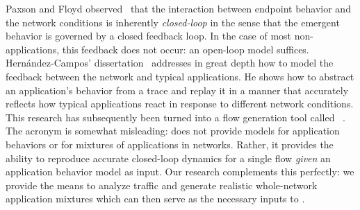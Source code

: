 \documentclass[twocolumn,final]{svjour3}
\begin{document}
Paxson and Floyd observed~\cite{Paxson95} that the interaction between endpoint behavior and the network conditions is inherently \textit{closed-loop} in the sense that the emergent behavior is governed by a closed feedback loop.
In the case of most non- applications, this feedback does not occur: an open-loop model suffices.
Hern\'andez-Campos' dissertation~\cite{Hernandez06:dissertation} addresses in great depth how to model the feedback between the network and typical  applications.
He shows how to abstract an application's behavior from a  trace and replay it in a manner that accurately reflects how typical applications react in response to different network conditions.
This research has subsequently been turned into a  flow generation tool called \tmix~\cite{Weigle06}.
The acronym is somewhat misleading: {\tmix} does not provide models for application behaviors or for mixtures of applications in networks.
Rather, it provides the ability to reproduce accurate closed-loop dynamics for a single  flow \emph{given} an application behavior model as input.
Our research complements this perfectly: we provide the means to analyze traffic and generate realistic whole-network application mixtures which can then serve as the necessary inputs to {\tmix}.

\end{document}
